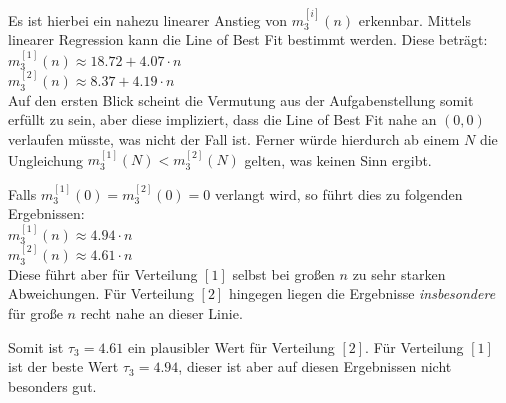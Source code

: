 \documentclass[maincolor=black]{exercise}
\begin{document}
Es ist hierbei ein nahezu linearer Anstieg von $m_3^{[i]}(n)$ erkennbar. Mittels linearer Regression kann die Line of Best Fit bestimmt werden. Diese beträgt:\\
$m_3^{[1]}(n) \approx 18.72+4.07\cdot n$\\
$m_3^{[2]}(n) \approx 8.37+4.19\cdot n$\\
Auf den ersten Blick scheint die Vermutung aus der Aufgabenstellung somit erfüllt zu sein, aber diese impliziert, dass die Line of Best Fit nahe an $(0,0)$ verlaufen müsste, was nicht der Fall ist. Ferner würde hierdurch ab einem $N$ die Ungleichung $m_3^{[1]}(N) < m_3^{[2]}(N)$ gelten, was keinen Sinn ergibt.\par
Falls $m_3^{[1]}(0) = m_3^{[2]}(0) = 0$ verlangt wird, so führt dies zu folgenden Ergebnissen:\\
$m_3^{[1]}(n) \approx 4.94\cdot n$\\
$m_3^{[2]}(n) \approx 4.61\cdot n$\\
Diese führt aber für Verteilung $[1]$ selbst bei großen $n$ zu sehr starken Abweichungen. Für Verteilung $[2]$ hingegen liegen die Ergebnisse \emph{insbesondere} für große $n$ recht nahe an dieser Linie.\par
Somit ist $\tau_3 = 4.61$ ein plausibler Wert für Verteilung $[2]$. Für Verteilung $[1]$ ist der beste Wert $\tau_3 = 4.94$, dieser ist aber auf diesen Ergebnissen nicht besonders gut.
\end{document}

